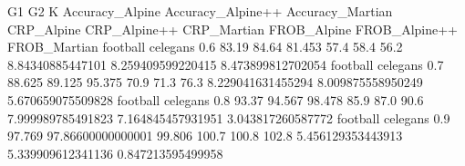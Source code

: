 G1 G2 K Accuracy_Alpine Accuracy_Alpine++ Accuracy_Martian CRP_Alpine CRP_Alpine++ CRP_Martian FROB_Alpine FROB_Alpine++ FROB_Martian
football celegans 0.6 83.19 84.64 81.453 57.4 58.4 56.2 8.84340885447101 8.259409599220415 8.473899812702054
football celegans 0.7 88.625 89.125 95.375 70.9 71.3 76.3 8.229041631455294 8.009875558950249 5.670659075509828
football celegans 0.8 93.37 94.567 98.478 85.9 87.0 90.6 7.999989785491823 7.164845457931951 3.043817260587772
football celegans 0.9 97.769 97.86600000000001 99.806 100.7 100.8 102.8 5.456129353443913 5.339909612341136 0.847213595499958
